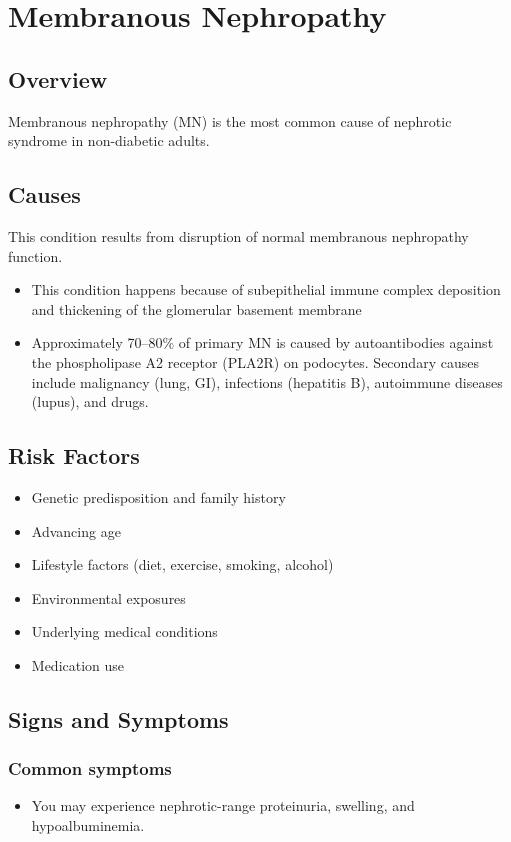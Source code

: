 \chapter{Membranous Nephropathy}
\label{sec:Membranous Nephropathy}

\section{Overview}
Membranous nephropathy (MN) is the most common cause of nephrotic syndrome in non-diabetic adults.
\section{Causes}
This condition results from disruption of normal membranous nephropathy function.

\begin{itemize}[noitemsep]
  \item This condition happens because of subepithelial immune complex deposition and thickening of the glomerular basement membrane
  \item Approximately 70--80\% of primary MN is caused by autoantibodies against the phospholipase A2 receptor (PLA2R) on podocytes. Secondary causes include malignancy (lung, GI), infections (hepatitis B), autoimmune diseases (lupus), and drugs.
\end{itemize}
\section{Risk Factors}


\begin{itemize}[noitemsep]
  \item Genetic predisposition and family history
  \item Advancing age
  \item Lifestyle factors (diet, exercise, smoking, alcohol)
  \item Environmental exposures
  \item Underlying medical conditions
  \item Medication use
\end{itemize}
\section{Signs and Symptoms}

\subsection{Common symptoms}
\begin{itemize}[noitemsep]
  \item You may experience nephrotic-range proteinuria, swelling, and hypoalbuminemia. 
  \end{itemize}


